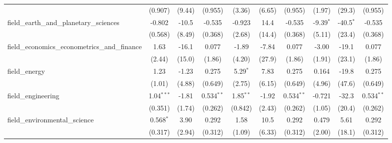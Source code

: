 \begin{tabular}{lccccccccc}
                                                               & (0.907)        & (9.44)         & (0.955)        & (3.36)         & (6.65)        & (0.955)        & (1.97)         & (29.3)         & (0.955)\\   
   field\_earth\_and\_planetary\_sciences                      & -0.802         & -10.5          & -0.535         & -0.923         & 14.4          & -0.535         & -9.39$^{*}$    & -40.5$^{*}$    & -0.535\\   
                                                               & (0.568)        & (8.49)         & (0.368)        & (2.68)         & (14.4)        & (0.368)        & (5.11)         & (23.4)         & (0.368)\\   
   field\_economics\_econometrics\_and\_finance                & 1.63           & -16.1          & 0.077          & -1.89          & -7.84         & 0.077          & -3.00          & -19.1          & 0.077\\   
                                                               & (2.44)         & (15.0)         & (1.86)         & (4.20)         & (27.9)        & (1.86)         & (1.91)         & (23.1)         & (1.86)\\   
   field\_energy                                               & 1.23           & -1.23          & 0.275          & 5.29$^{*}$     & 7.83          & 0.275          & 0.164          & -19.8          & 0.275\\   
                                                               & (1.01)         & (4.88)         & (0.649)        & (2.75)         & (6.15)        & (0.649)        & (4.96)         & (47.6)         & (0.649)\\   
   field\_engineering                                          & 1.04$^{***}$   & -1.81          & 0.534$^{**}$   & 1.85$^{**}$    & -1.92         & 0.534$^{**}$   & -0.721         & -32.3          & 0.534$^{**}$\\   
                                                               & (0.351)        & (1.74)         & (0.262)        & (0.842)        & (2.43)        & (0.262)        & (1.05)         & (20.4)         & (0.262)\\   
   field\_environmental\_science                               & 0.568$^{*}$    & 3.90           & 0.292          & 1.58           & 10.5          & 0.292          & 0.479          & 5.61           & 0.292\\   
                                                               & (0.317)        & (2.94)         & (0.312)        & (1.09)         & (6.33)        & (0.312)        & (2.00)         & (18.1)         & (0.312)\\   

\end{tabular}

